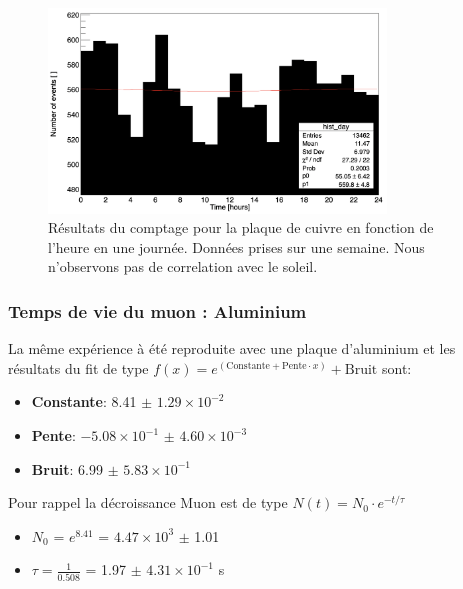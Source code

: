 \documentclass[12pt]{article}
\begin{document}
\begin{figure}[htpb!]
    \centering
    \includegraphics[width=0.8\textwidth]{graphiques/experience1/cuivre/oscillation_jour_cuivre_total_comptage.png}
    \caption{Résultats du comptage pour la plaque de cuivre en fonction de l'heure en une journée. Données prises sur une semaine. Nous n'observons pas de correlation avec le soleil.}
    \label{fig:oscillation_jour_cuivre_total}
\end{figure}


\newpage
\subsubsection{Temps de vie du muon : Aluminium}

La même expérience à été reproduite avec une plaque d'aluminium et les résultats du fit de type $f(x) = e^{(\text{Constante}+\text{Pente}\cdot x)}+\text{Bruit}$ sont: 

\begin{itemize}
    \item \textbf{Constante}: 8.41 $\pm$ $1.29\times10^{-2}$
    \item \textbf{Pente}: $-5.08\times10^{-1}$ $\pm$ $4.60\times10^{-3}$
    \item \textbf{Bruit}: 6.99 $\pm$ $5.83\times10^{-1}$
\end{itemize}
    
Pour rappel la décroissance Muon est de type $N(t) = N_{0}\cdot e^{-t/\tau}$
\begin{itemize}
    \item $N_{0}$ = $e^{8.41}$ = $4.47\times10^{3}$ $\pm$ 1.01
    \item $\tau=\frac{1}{0.508}$ = 1.97 $\pm$ $4.31\times10^{-1}$ \SIUnitSymbolMicro s
\end{itemize}
\end{document}
